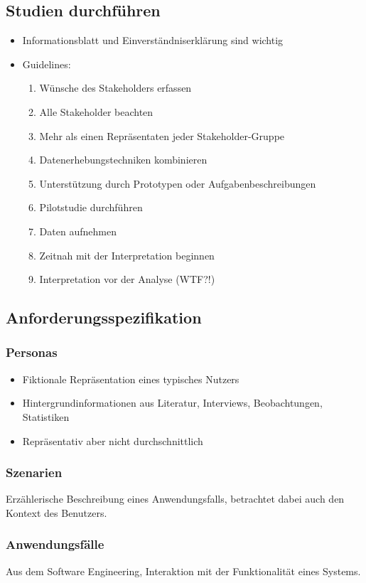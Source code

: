\documentclass[a4paper,10pt]{article}
\begin{document}
\subsection{Studien durchführen}
\begin{itemize}
	\item Informationsblatt und Einverständniserklärung sind wichtig
	\item Guidelines:
	\begin{enumerate}
		\item Wünsche des Stakeholders erfassen
		\item Alle Stakeholder beachten
		\item Mehr als einen Repräsentaten jeder Stakeholder-Gruppe
		\item Datenerhebungstechniken kombinieren
		\item Unterstützung durch Prototypen oder Aufgabenbeschreibungen
		\item Pilotstudie durchführen
		\item Daten aufnehmen
		\item Zeitnah mit der Interpretation beginnen
		\item Interpretation vor der Analyse (WTF?!)
	\end{enumerate}
\end{itemize}

\subsection{Anforderungsspezifikation}

\subsubsection{Personas}
\begin{itemize}
	\item Fiktionale Repräsentation eines typisches Nutzers
	\item Hintergrundinformationen aus Literatur, Interviews, Beobachtungen, Statistiken
	\item Repräsentativ aber nicht durchschnittlich
\end{itemize}

\subsubsection{Szenarien}
Erzählerische Beschreibung eines Anwendungsfalls, betrachtet dabei auch den Kontext des Benutzers.

\subsubsection{Anwendungsfälle}
Aus dem Software Engineering, Interaktion mit der Funktionalität eines Systems.
\end{document}
